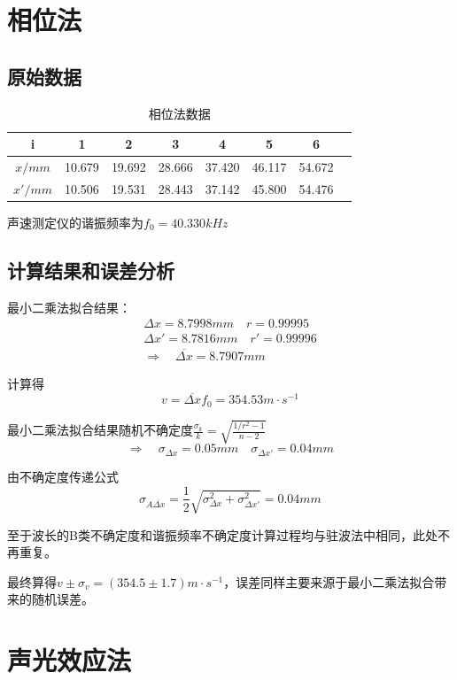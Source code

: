 \documentclass[12pt, a4paper]{ctexart}
\begin{document}
\section{相位法}
\subsection{原始数据}

\begin{table}[htbp]
  \centering
  \caption{相位法数据}
    \begin{tabular}{cccccccc}
    \toprule
    i     & 1     & 2     & 3     & 4     & 5     & 6     \\
    \midrule
    $x/mm$  & 10.679 & 19.692 & 28.666 & 37.420 & 46.117 & 54.672 \\
    $x'/mm$ & 10.506 & 19.531 & 28.443 & 37.142 & 45.800 & 54.476 \\
    \bottomrule
    \end{tabular}
  \label{tab:t5}
\end{table}
声速测定仪的谐振频率为$f_0 = 40.330kHz$

\subsection{计算结果和误差分析}
最小二乘法拟合结果：
\begin{gather*}
  \Delta x = 8.7998mm \quad r = 0.99995\\
  \Delta x' = 8.7816mm \quad r' = 0.99996\\
  \Rightarrow \quad \overline{\Delta x} = 8.7907mm 
\end{gather*}

计算得
\[
    v = \overline{\Delta x} f_0 = 354.53m\cdot s^{-1}
\]

最小二乘法拟合结果随机不确定度$\frac{\sigma_k}{k} = \sqrt{\frac{1/r^2 - 1}{n - 2}}$
\[
    \Rightarrow \quad \sigma_{\Delta x} = 0.05mm \quad \sigma_{\Delta x'} = 0.04mm
\]

由不确定度传递公式
\[
    \sigma_{A \overline{\Delta x}} = \frac12 \sqrt{\sigma_{\Delta x}^2 + \sigma_{\Delta x'}^2} = 0.04mm
\]

至于波长的B类不确定度和谐振频率不确定度计算过程均与驻波法中相同，此处不再重复。

最终算得$v \pm \sigma_v = (354.5 \pm 1.7) m \cdot s^{-1}$，误差同样主要来源于最小二乘法拟合带来的随机误差。

\section{声光效应法}
\end{document}

